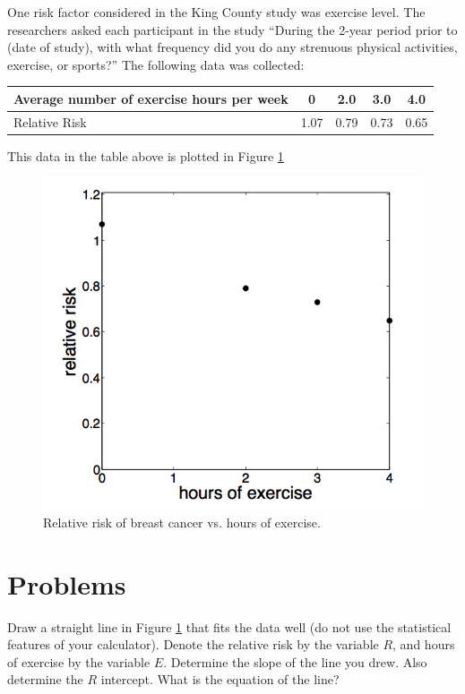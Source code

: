 \vspace{.2in}

One risk factor considered in the King County study was exercise
level.  The researchers asked each participant in the study ``During
the 2-year period prior to (date of study), with what frequency did
you do any strenuous physical activities, exercise, or sports?''
The following data was collected:
\begin{center}
  \begin{tabular}{lcccc}\toprule
    Average number of exercise hours per week & 0 & 2.0 & 3.0 & 4.0\\
    \midrule
    Relative Risk & 1.07 & 0.79 & 0.73 & 0.65 \\ \bottomrule
  \end{tabular}
\end{center}
This data in the table above is plotted in Figure \ref{fig:exercise}
\begin{figure}
  \includegraphics[scale=0.6]{Project1_ExVsRR.png}
  \caption{Relative risk of breast cancer vs. hours of exercise.}
  \label{fig:exercise}
\end{figure}

\section{Problems}
\problemfont
\problem
\subprob  Draw a straight line in Figure \ref{fig:exercise} that fits
the data well (do not use the statistical features of your
calculator).  Denote the relative risk by the variable $R$, and
hours of exercise by the variable $E$.  Determine the slope of the
line you drew.  Also determine the $R$ intercept.  What is the
equation of the line?

